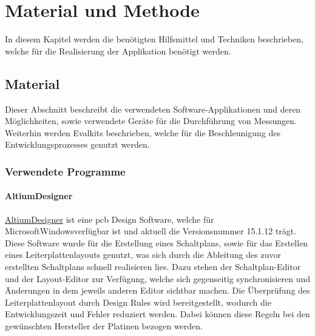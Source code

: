 \chapter{Material und Methode}
In diesem Kapitel werden die benötigten Hilfsmittel und Techniken beschrieben, welche für die Realisierung der Applikation benötigt werden.
\section{Material}
Dieser Abschnitt beschreibt die verwendeten Software-Applikationen und deren Möglichkeiten, sowie verwendete Geräte für die Durchführung von Messungen. Weiterhin werden Evalkits beschrieben, welche für die Beschleunigung des Entwicklungsprozesses genutzt werden.
\subsection{Verwendete Programme}
\subsubsection*{Altium\SymbReg Designer\SymbReg}\label{sw:altium}
\href{http://www.altium.com/de/altium-designer/overview}{Altium\SymbReg Designer\SymbReg} ist eine \ac{pcb} Design Software, welche für Microsoft\SymbC Windows\SymbReg verfügbar ist und aktuell die Versionsnummer 15.1.12 trägt. Diese Software wurde für die Erstellung eines Schaltplans, sowie für das Erstellen eines Leiterplattenlayouts genutzt, was sich durch die Ableitung des zuvor erstellten Schaltplans schnell realisieren lies. Dazu stehen der Schaltplan-Editor und der Layout-Editor zur Verfügung, welche sich gegenseitig synchronisieren und Änderungen in dem jeweils anderen Editor sichtbar machen. Die Überprüfung des Leiterplattenlayout durch \glqq Design Rules\grqq{} wird bereitgestellt, wodurch die Entwicklungszeit und Fehler reduziert werden. Dabei können diese Regeln bei den gewünschten Hersteller der Platinen bezogen werden.\cite{altium}

